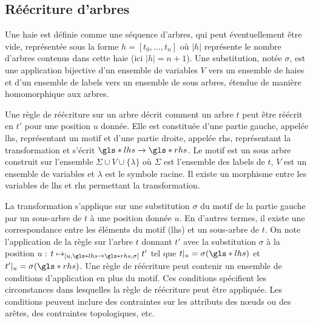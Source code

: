\subsection{Réécriture d'arbres}

\begin{definition}[Haie]
    Une haie est définie comme une séquence d'arbres, qui peut éventuellement être vide, représentée sous la forme $h = [t_0, \dots , t_n]$ où $|h|$ représente le nombre d'arbres contenus dans cette haie (ici $|h| = n + 1$).
    Une substitution, notée $\sigma$, est une application bijective d'un ensemble de variables $V$ vers un ensemble de haies et d'un ensemble de labels vers un ensemble de sous arbres, étendue de manière homomorphique aux arbres.
\end{definition}

\begin{definition}
    Une règle de réécriture sur un arbre décrit comment un arbre $t$ peut être réécrit en $t'$ pour une position $u$ donnée.
    Elle est constituée d'une partie gauche, appelée \gls{lhs}, représentant un motif et d'une partie droite, appelée \gls{rhs}, représentant la transformation et s'écrit $\gls*{lhs} \to \gls*{rhs}$.
    Le motif est un sous arbre construit sur l'ensemble $\Sigma \cup V \cup \{\lambda\}$ où $\Sigma$ est l'ensemble des labels de $t$, $V$ est un ensemble de variables et $\lambda$ est le symbole racine.
    Il existe un morphisme entre les variables de \gls{lhs} et \gls{rhs} permettant la transformation.

    La transformation s'applique sur une substitution $\sigma$ du motif de la partie gauche par un sous-arbre de $t$ à une position donnée $u$.
    En d'autres termes, il existe une correspondance entre les éléments du motif (\gls{lhs}) et un sous-arbre de $t$.
    On note l'application de la règle sur l'arbre $t$ donnant $t'$ avec la substitution $\sigma$ à la position $u$ : $t \mapsto_{[u, \gls*{lhs} \to \gls*{rhs}, \sigma]} t'$ tel que $t|_u = \sigma(\gls*{lhs})$ et $t'|_u = \sigma(\gls*{rhs})$.
    Une règle de réécriture peut contenir un ensemble de conditions d'application en plus du motif.
    Ces conditions spécifient les circonstances dans lesquelles la règle de réécriture peut être appliquée.
    Les conditions peuvent inclure des contraintes sur les attributs des nœuds ou des arêtes, des contraintes topologiques, etc.
\end{definition}

